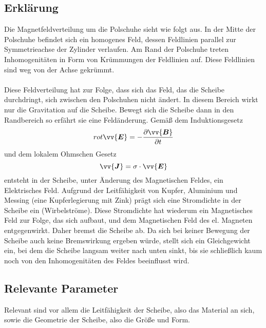 \documentclass[a4paper,twoside,12pt,DIV=13,BCOR=5mm,numbers=noenddot,cleardoublepage=empty]{scrbook}
\begin{document}
        \subsection{Erkl\"arung}
        Die Magnetfeldverteilung um die Polschuhe sieht wie folgt aus. In der Mitte der Polschuhe befindet sich ein homogenes Feld, dessen Feldlinien parallel zur Symmetrieachse der Zylinder verlaufen. Am Rand der Polschuhe treten Inhomogenit\"aten in Form von Kr\"ummungen der Feldlinien auf. Diese Feldlinien sind weg von der Achse gekr\"ummt.
        \\
        \\
        Diese Feldverteilung hat zur Folge, dass sich das Feld, das die Scheibe durchdringt, sich zwischen den Polschuhen nicht \"andert. In diesem Bereich wirkt nur die Gravitation auf die Scheibe. Bewegt sich die Scheibe dann in den Randbereich so erf\"ahrt sie eine Feld\"anderung. Gem\"a\ss{} dem Induktionsgesetz
        \begin{equation}
            rot \vv{\bm{E}} = - \frac{\partial \vv{\bm{B}}}{\partial t}
        \end{equation}
        und dem lokalem Ohmschen Gesetz
        \begin{equation}
            \vv{\bm{J}} = \sigma \cdot \vv{\bm{E}}
        \end{equation}
        entsteht in der Scheibe, unter \"Anderung des Magnetischen Feldes, ein 
        Elektrisches Feld. Aufgrund der Leitf\"ahigkeit von Kupfer, Aluminium 
        und Messing (eine Kupferlegierung mit Zink) pr\"agt sich eine Stromdichte 
        in der Scheibe ein (Wirbelstr\"ome). Diese Stromdichte hat wiederum ein 
        Magnetisches Feld zur Folge, das sich aufbaut, und dem Magnetischen 
        Feld des el. Magneten entgegenwirkt. Daher bremst die Scheibe ab. Da 
        sich bei keiner Bewegung der Scheibe auch keine Bremswirkung ergeben 
        w\"urde, stellt sich ein Gleichgewicht ein, bei dem die Scheibe langsam 
        weiter nach unten sinkt, bis sie schlie\ss{}lich kaum noch von den 
        Inhomogenit\"aten des Feldes beeinflusst wird.
        \subsection{Relevante Parameter}
        Relevant sind vor allem die Leitf\"ahigkeit der Scheibe, also das Material an sich, sowie die Geometrie der Scheibe, also die Gr\"o\ss{}e und Form.
\end{document}
